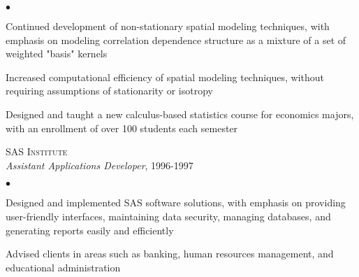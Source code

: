 \documentclass[11pt]{article}
\def\newempl{\vspace*{0.5cm}}
\def\newitem{\vspace*{0.2cm}}
\begin{document}
\begin{list}{$\bullet$}{
\setlength{\topsep}{0cm}
\setlength{\partopsep}{0cm}
\setlength{\parsep}{0cm}
\setlength{\itemsep}{0cm}
\setlength{\labelsep}{1ex}
\setlength{\labelwidth}{1em}
\setlength{\leftmargin}{1em}
}
\item Continued development of non-stationary spatial modeling techniques, with
emphasis on modeling correlation dependence structure as a mixture of
a set of weighted "basis" kernels
\item Increased computational efficiency of spatial modeling
  techniques, without requiring assumptions of stationarity or
  isotropy
\item Designed and taught a new calculus-based statistics course for economics majors, with an enrollment of over 100 students each semester
\end{list}


\newempl
\textsc{SAS Institute}\\ %
\textit{Assistant Applications Developer}, 1996-1997

\begin{list}{$\bullet$}{
\setlength{\topsep}{0cm}
\setlength{\partopsep}{0cm}
\setlength{\parsep}{0cm}
\setlength{\itemsep}{0cm}
\setlength{\labelsep}{1ex}
\setlength{\labelwidth}{1em}
\setlength{\leftmargin}{1em}
}
\item Designed and implemented SAS software solutions, with emphasis on
providing user-friendly interfaces, maintaining data security,
managing databases, and generating reports easily and efficiently
\item Advised clients in areas such as banking, human resources management, and
educational administration
\end{list}

\end{document}
